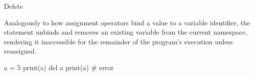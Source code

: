 \documentclass[10pt]{article}
\begin{document}
    \begin{core}{Delete}

      Analogously to how assignment operators bind a value to a variable identifier, the  statement unbinds and removes an existing variable from the current namespace, rendering it inaccessible for the remainder of the program's execution unless reassigned.

      \begin{pyconsole}

        a = 5
        print(a)
        del a
        print(a) # error

      \end{pyconsole}

    \end{core}
\end{document}
